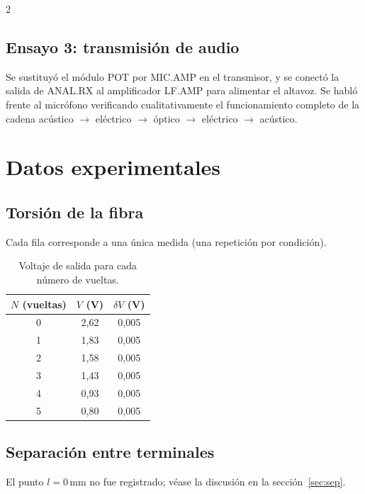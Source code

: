 \documentclass[12pt,a4paper]{article}
\begin{document}
\begin{multicols}{2}
\subsection{Ensayo 3: transmisión de audio}

Se sustituyó el módulo POT por MIC.AMP en el transmisor, y se conectó la salida de ANAL.RX al amplificador LF.AMP para alimentar el altavoz. Se habló frente al micrófono verificando cualitativamente el funcionamiento completo de la cadena acústico $\to$ eléctrico $\to$ óptico $\to$ eléctrico $\to$ acústico.

\section{Datos experimentales}

\subsection{Torsión de la fibra}

Cada fila corresponde a una única medida (una repetición por condición).

\begin{table}[H]
\centering
\caption{Voltaje de salida para cada número de vueltas.}
\label{tab:raw_torsion}
\small
\begin{tabular}{ccc}
\toprule
$N$ (vueltas) & $V$ (V) & $\delta V$ (V) \\
\midrule
0 & 2{,}62 & 0{,}005 \\
1 & 1{,}83 & 0{,}005 \\
2 & 1{,}58 & 0{,}005 \\
3 & 1{,}43 & 0{,}005 \\
4 & 0{,}93 & 0{,}005 \\
5 & 0{,}80 & 0{,}005 \\
\bottomrule
\end{tabular}
\end{table}

\subsection{Separación entre terminales}

El punto $l=0$\,mm no fue registrado; véase la discusión en la sección~\ref{sec:sep}.


\end{multicols}
\end{document}
